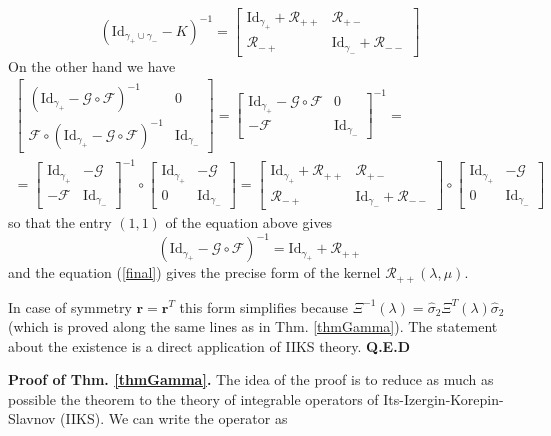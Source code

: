 \documentclass{article}
\def\r{ {\mathbf r}}
\def\s{\sigma}
\def\wh{\widehat}
\def\bea{\begin{eqnarray}}
\def\eea{\end{eqnarray}}
\def\Id{\mathrm{Id}}
\def\QED{ {\bf Q.E.D}\par \vskip 4pt}
\def\le{\left}
\def\ri{\right}
\begin{document}
$$(\Id_{\gamma_+\cup\gamma_-}-K)^{-1}=\le[\begin{array}{ccc}
									\Id_{\gamma_+}+\mathcal R_{++} & \mathcal R_{+-}\\
									\mathcal R_{-+} & \Id_{\gamma_-} + \mathcal R_{--}
									\end{array}\ri] $$
On the other hand we have
\bea
	\le[\begin{array}{ccc}
		(\Id_{\gamma_+}-\mathcal G \circ \mathcal F)^{-1} & 0\\
		\mathcal F\circ (\Id_{\gamma_+}-\mathcal G \circ \mathcal F)^{-1} & \Id_{\gamma_-}\end{array}\ri]=\le[\begin{array}{ccc}
\Id_{\gamma_+}-\mathcal G \circ \mathcal F & 0\\
-\mathcal F & \Id_{\gamma_-} \end{array}\ri]^{-1}=
\nonumber\\
=\le[\begin{array}{ccc} \Id_{\gamma_+} & -\mathcal G\\
-\mathcal F & \Id_{\gamma_-}\end{array}\ri]^{-1}\circ\le[\begin{array}{ccc} \Id_{\gamma_+} & -\mathcal G\\
0 & \Id_{\gamma_-}\end{array}\ri]=
\le[\begin{array}{ccc} \Id_{\gamma_+}+\mathcal R_{++} & \mathcal R_{+-}\\
\mathcal R_{-+} & \Id_{\gamma_-}+\mathcal R_{--}\end{array}\ri]\circ\le[\begin{array}{ccc} \Id_{\gamma_+} & -\mathcal G\\
0 & \Id_{\gamma_-}\end{array}\ri]\nonumber
\eea
so that the entry $(1,1)$ of the equation above gives
$$(\Id_{\gamma_+}-\mathcal G \circ \mathcal F)^{-1}=\Id_{\gamma_+}+\mathcal R_{++}$$ and the equation (\ref{final}) gives the precise form of the kernel $\mathcal R_{++}(\lambda,\mu)$.

In case of symmetry $\r=\r^T$ this form simplifies because $\Xi^{-1}(\lambda) = \wh \s_2 \Xi^T(\lambda) \wh \s_2$ (which is proved along the same lines as in Thm. \ref{thmGamma}). The statement about the existence is a direct application of IIKS theory.
 \QED
%
%
%
%
%



{\bf Proof of Thm. \ref{thmGamma}.}
The idea of the proof is to reduce as much as possible the theorem to the theory of integrable operators of Its-Izergin-Korepin-Slavnov (IIKS). We can write the operator as 
\end{document}
